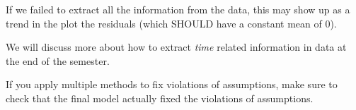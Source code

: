 \documentclass[12pt]{../notes}
\begin{document}
\nspace
If we failed to extract all the information from the data, this may show up as a trend in the plot the residuals (which SHOULD have a constant mean of 0). 

\nspace
We will discuss more about how to extract \textit{time} related information in data at the end of the semester. 

\nspace
If you apply multiple methods to fix violations of assumptions, make sure to check that the final model actually fixed the violations of assumptions. 
















\end{document}
